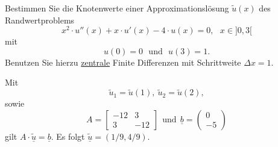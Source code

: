 Bestimmen Sie die Knotenwerte einer Approximationslösung $\tilde u(x)$
des Randwertproblems
\[
x^2 \cdot u''(x) + x \cdot u'(x) - 4 \cdot u(x) = 0, \ \ \ x \in ]0,3[
\]
mit
\[
u(0) = 0 \ \ \ \mbox{und} \ \ \ u(3) = 1.
\]
Benutzen Sie hierzu \underline{zentrale} Finite Differenzen mit Schrittweite
$\Delta x = 1$. 

\begin{loesung}
Mit 
\[
\tilde u_1 = \tilde u(1), \ \tilde u_2 = \tilde u(2),
\]
sowie 
\[
A = \left[\begin{array}{rr} 
-12 & 3 \\
3 & -12 \end{array}\right] \ \ \text{und} \ \
\underline{b} =  \left(\begin{array}{r} 0 \\ -5 \end{array}\right)
\]
gilt  $A \cdot \underline{\tilde u} = \underline{b}.$
Es folgt $\underline{\tilde u} = (1/9, 4/9).$
\end{loesung}
